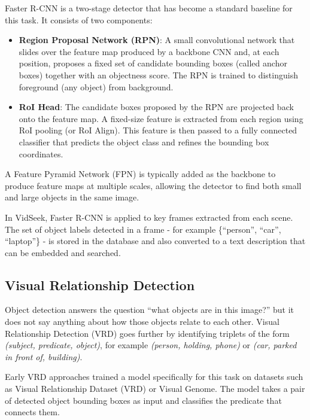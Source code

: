 \documentclass[12pt, a4paper]{report}
\begin{document}
Faster R-CNN \cite{ren2015faster} is a two-stage detector that has become
a standard baseline for this task. It consists of two components:

\begin{itemize}
  \item \textbf{Region Proposal Network (RPN)}: A small convolutional network
    that slides over the feature map produced by a backbone CNN and, at each
    position, proposes a fixed set of candidate bounding boxes (called anchor
    boxes) together with an objectness score. The RPN is trained to distinguish
    foreground (any object) from background.

  \item \textbf{RoI Head}: The candidate boxes proposed by the RPN are projected
    back onto the feature map. A fixed-size feature is extracted from each
    region using RoI pooling (or RoI Align). This feature is then passed
    to a fully connected classifier that predicts the object class and refines
    the bounding box coordinates.
\end{itemize}

A Feature Pyramid Network (FPN) is typically added as the backbone to produce
feature maps at multiple scales, allowing the detector to find both small and
large objects in the same image.

In VidSeek, Faster R-CNN is applied to key frames extracted from each scene.
The set of object labels detected in a frame - for example \{``person'', ``car'',
``laptop''\} - is stored in the database and also converted to a text description
that can be embedded and searched.

\subsection{Visual Relationship Detection}

Object detection answers the question ``what objects are in this image?'' but
it does not say anything about how those objects relate to each other.
Visual Relationship Detection (VRD) goes further by identifying triplets of
the form \textit{(subject, predicate, object)}, for example \textit{(person,
holding, phone)} or \textit{(car, parked in front of, building)}.

Early VRD approaches trained a model specifically for this task on datasets
such as Visual Relationship Dataset (VRD) or Visual Genome. The model takes
a pair of detected object bounding boxes as input and classifies the predicate
that connects them.
\end{document}
